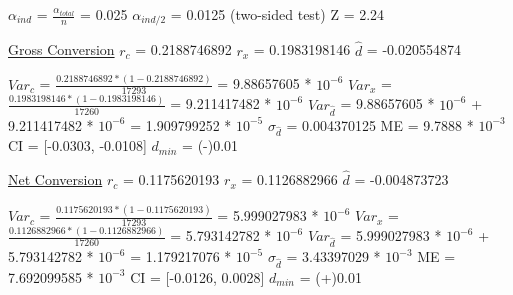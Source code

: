 \documentclass[paper=a4, fontsize=11pt]{scrartcl} %
\numberwithin{equation}{section} %
\numberwithin{figure}{section} %
\numberwithin{table}{section} %
\begin{document}
$\alpha_{ind}$ = $\frac{\alpha_{total}}{n}$ = 0.025
\newline
$\alpha_{ind/2}$ = 0.0125 (two-sided test)
\newline
Z = 2.24
\newline
\newline

\underline{Gross Conversion} \newline
\newline
$r_{c}$ = 0.2188746892
\quad
$r_{x}$ = 0.1983198146
\quad
$\widehat{d}$ = -0.020554874
\newline

$Var_{c}$ = $\frac{0.2188746892 * (1 - 0.2188746892)}{17293}$ = 9.88657605 * $10^{-6}$
\newline
$Var_{x}$ = $\frac{0.1983198146 * (1 - 0.1983198146)}{17260}$ = 9.211417482 * $10^{-6}$
\newline
$Var_{\widehat{d}}$ = 9.88657605 * $10^{-6}$ + 9.211417482 * $10^{-6}$ = 1.909799252 * $10^{-5}$
\newline
\newline
$\sigma_{\widehat{d}}$ = 0.004370125
\newline
ME = 9.7888 * $10^{-3}$
\newline
CI = [-0.0303, -0.0108]
\newline
$d_{min}$ = (-)0.01
\newline
\newline


\underline{Net Conversion} \newline
\newline
$r_{c}$ = 0.1175620193
\quad
$r_{x}$ = 0.1126882966
\quad
$\widehat{d}$ = -0.004873723
\newline

$Var_{c}$ = $\frac{0.1175620193 * (1 - 0.1175620193)}{17293}$ = 5.999027983 * $10^{-6}$
\newline
$Var_{x}$ = $\frac{0.1126882966 * (1 - 0.1126882966)}{17260}$ =  5.793142782 * $10^{-6}$
\newline
$Var_{\widehat{d}}$ = 5.999027983 * $10^{-6}$ + 5.793142782 * $10^{-6}$ = 1.179217076 * $10^{-5}$
\newline
\newline
$\sigma_{\widehat{d}}$ = 3.43397029 * $10^{-3}$
\newline
ME = 7.692099585 * $10^{-3}$
\newline
CI = [-0.0126, 0.0028]
\newline
$d_{min}$ = (+)0.01
\newline
\end{document}
